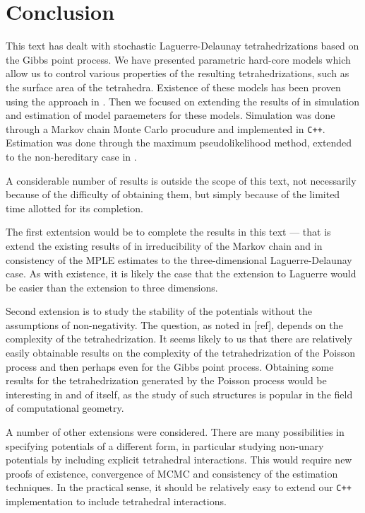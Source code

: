 \chapter*{Conclusion}

This text has dealt with stochastic Laguerre-Delaunay tetrahedrizations based on the Gibbs point process. We have presented parametric hard-core models which allow us to control various properties of the resulting tetrahedrizations, such as the surface area of the tetrahedra. Existence of these models has been proven using the approach in \cite{DDG12}. Then we focused on extending the results of \cite{DereudreLavancier2011} in simulation and estimation of model paraemeters for these models. Simulation was done through a Markov chain Monte Carlo procudure and implemented in \texttt{C++}. Estimation was done through the maximum pseudolikelihood method, extended to the non-hereditary case in \cite{DereudreLavancier2009}.


A considerable number of results is outside the scope of this text, not necessarily because of the difficulty of obtaining them, but simply because of the limited time allotted for its completion. 

The first extentsion would be to complete the results in this text --- that is extend the existing results of \cite{DereudreLavancier2009}  in irreducibility of the Markov chain and \cite{DereudreLavancier2011} in consistency of the MPLE estimates to the three-dimensional Laguerre-Delaunay case. As with existence, it is likely the case that the extension to Laguerre would be easier than the extension to three dimensions. 

Second extension is to study the stability of the potentials without the assumptions of non-negativity. The question, as noted in [ref], depends on the complexity of the tetrahedrization. It seems likely to us that there are relatively easily obtainable results on the complexity of the tetrahedrization of the Poisson process and then perhaps even for the Gibbs point process. Obtaining some results for the tetrahedrization generated by the Poisson process would be interesting in and of itself, as the study of such structures is popular in the field of computational geometry.

A number of other extensions were considered. There are many possibilities in specifying potentials of a different form, in particular studying non-unary potentials by including explicit tetrahedral interactions. This would require new proofs of existence, convergence of MCMC and consistency of the estimation techniques. In the practical sense, it should be relatively easy to extend our \texttt{C++} implementation to include tetrahedral interactions.

